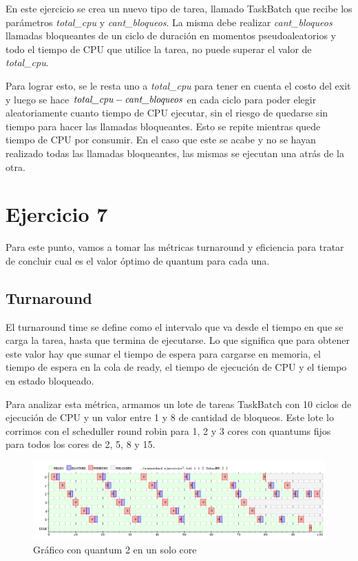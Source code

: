 \documentclass[a4paper,11pt]{article}
\begin{document}
En este ejercicio se crea un nuevo tipo de tarea, llamado TaskBatch que recibe los parámetros \emph{total\_cpu} y \emph{cant\_bloqueos}. La misma debe realizar \emph{cant\_bloqueos} llamadas bloqueantes de un ciclo de duración en momentos pseudoaleatorios y todo el tiempo de CPU que utilice la tarea, no puede superar el valor de \emph{total\_cpu}.

Para lograr esto, se le resta uno a \emph{total\_cpu} para tener en cuenta el costo del exit y luego se hace $\emph{total\_cpu} - \emph{cant\_bloqueos}$ en cada ciclo para poder elegir aleatoriamente cuanto tiempo de CPU ejecutar, sin el riesgo de quedarse sin tiempo para hacer las llamadas bloqueantes. Esto se repite mientras quede tiempo de CPU por consumir. En el caso que este se acabe y no se hayan realizado todas las llamadas bloqueantes, las mismas se ejecutan una atrás de la otra.


\pagebreak

\section{Ejercicio 7}
Para este punto, vamos a tomar las métricas turnaround y eficiencia para tratar de concluir cual es el valor óptimo de quantum para cada una.

\subsection{Turnaround}
El turnaround time se define como el intervalo que va desde el tiempo en que se carga la tarea, hasta que termina de ejecutarse. Lo que significa que para obtener este valor hay que sumar el tiempo de espera para cargarse en memoria, el tiempo de espera en la cola de ready, el tiempo de ejecución de CPU y el tiempo en estado bloqueado.

Para analizar esta métrica, armamos un lote de tareas TaskBatch con 10 ciclos de ejecución de CPU y un valor entre 1 y 8 de cantidad de bloqueos. Este lote lo corrimos con el scheduller round robin para 1, 2 y 3 cores con quantums fijos para todos los cores de 2, 5, 8 y 15.

\begin{figure}[H]
\centering
\includegraphics[scale=.6, width=1\textwidth]{graficos/ej7-1core-q1}
\caption{Gráfico con quantum 2 en un solo core}
\end{figure}
\end{document}
